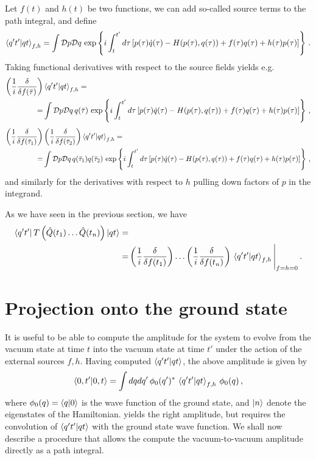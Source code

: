 \documentclass[notes]{subfiles}
\begin{document}
Let $f(t)$ and $h(t)$ be two functions, we can add so-called source
terms to the path integral, and define
\begin{equation}
  \label{eq:PathIntegralSources}
  \braket{q't'}{qt}_{f,h} = \int \mathcal{D}p \mathcal{D}q\,\exp 
  \left\{
    i \int_{t}^{t'} d\tau \left[
      p(\tau) \dot{q}(\tau) - H(p(\tau),q(\tau)) + f(\tau) q(\tau) +
      h(\tau) p(\tau)
      \right]
  \right\}\, .
\end{equation}
Taking functional derivatives with respect to the source fields yields
e.g.
\begin{align}
  \left(\frac{1}{i} \frac{\delta}{\delta f(\bar\tau)} \right)&
  \braket{q't'}{qt}_{f,h} = \nonumber \\
  =&\int \mathcal{D}p \mathcal{D}q\,
  q(\bar{\tau})\,
  \exp \left\{
  i \int_{t}^{t'} d\tau \left[
  p(\tau) \dot{q}(\tau) - H(p(\tau),q(\tau)) + f(\tau) q(\tau) +
  h(\tau) p(\tau)
  \right]
  \right\}\, ,
\end{align}
\begin{align}
  \left(\frac{1}{i} \frac{\delta}{\delta f(\bar\tau_1)} \right)&
  \left(\frac{1}{i} \frac{\delta}{\delta f(\bar\tau_2)} \right)
  \braket{q't'}{qt}_{f,h} = \nonumber \\
  =&\int \mathcal{D}p \mathcal{D}q\,
  q(\bar{\tau}_1) q(\bar{\tau}_2)\,
  \exp \left\{
  i \int_{t}^{t'} d\tau \left[
  p(\tau) \dot{q}(\tau) - H(p(\tau),q(\tau)) + f(\tau) q(\tau) +
  h(\tau) p(\tau)
  \right]
  \right\}\, , 
\end{align}
and similarly for the derivatives with respect to $h$ pulling down
factors of $p$ in the integrand. 

As we have seen in the previous section, we have
\begin{align}
  \bra{q't'}  T\left(
  \hat{Q}(t_1)\ldots \hat{Q}(t_n) 
  \right)
  \ket{qt} =& \nonumber \\
  =& \left(\frac{1}{i} \frac{\delta}{\delta f(t_1)} \right) \ldots
    \left(\frac{1}{i} \frac{\delta}{\delta f(t_n)} \right)\,
    \braket{q't'}{qt}_{f,h}\Bigg|_{f=h=0}\, .
\end{align}

\section{Projection onto the ground state}
\label{sec:proj-onto-ground}

It is useful to be able to compute the amplitude for the system to
evolve from the vacuum state at time $t$ into the vacuum state at time
$t'$ under the action of the external sources $f,h$. Having computed
$\braket{q't'}{qt}$, the above amplitude is given by
\begin{align}
  \label{eq:VacToVacAmpl}
  \braket{0,t'}{0,t} = 
  \int dq dq'\, \phi_0(q')^*\, \braket{q't'}{qt}_{f,h}\, \phi_0(q)\, ,
\end{align}
where $\phi_0(q)=\braket{q}{0}$ is the wave function of the ground
state, and $\ket{n}$ denote the eigenstates of the
Hamiltonian.  yields the right amplitude, but
requires the convolution of $\braket{q't'}{qt}$ with the ground state
wave function. We shall now describe a procedure that allows the
compute the vacuum-to-vacuum amplitude directly as a path integral. 
\end{document}
